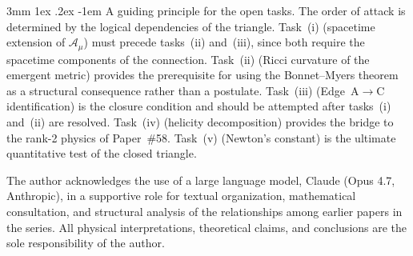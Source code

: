 \documentclass[%
 reprint, amsmath,amssymb, aps, prd, ]{revtex4-2}
\makeatletter
\numberwithin{equation}{section}
\renewcommand\paragraph{%
  \@startsection{paragraph}{4}{\z@}%
    {3mm \@plus 1ex \@minus .2ex}%
    {-1em}%
    {\normalfont\normalsize\itshape}}
\newcommand{\BerryA}{\mathcal{A}}
\makeatother
\begin{document}
\paragraph{A guiding principle for the open tasks.}
The order of attack is determined by the logical dependencies of the triangle.
Task~(i) (spacetime extension of $\BerryA_\mu$) must precede tasks~(ii) and~(iii), since both require the spacetime components of the connection.
Task~(ii) (Ricci curvature of the emergent metric) provides the prerequisite for using the Bonnet--Myers theorem as a structural consequence rather than a postulate.
Task~(iii) (Edge~A$\to$C identification) is the closure condition and should be attempted after tasks~(i) and~(ii) are resolved.
Task~(iv) (helicity decomposition) provides the bridge to the rank-2 physics of Paper~\#58.
Task~(v) (Newton's constant) is the ultimate quantitative test of the closed triangle.

\begin{acknowledgments}
The author acknowledges the use of a large language model, Claude (Opus 4.7, Anthropic), in a supportive role for textual organization, mathematical consultation, and structural analysis of the relationships among earlier papers in the series. All physical interpretations, theoretical claims, and conclusions are the sole responsibility of the author.
\end{acknowledgments}
\end{document}
